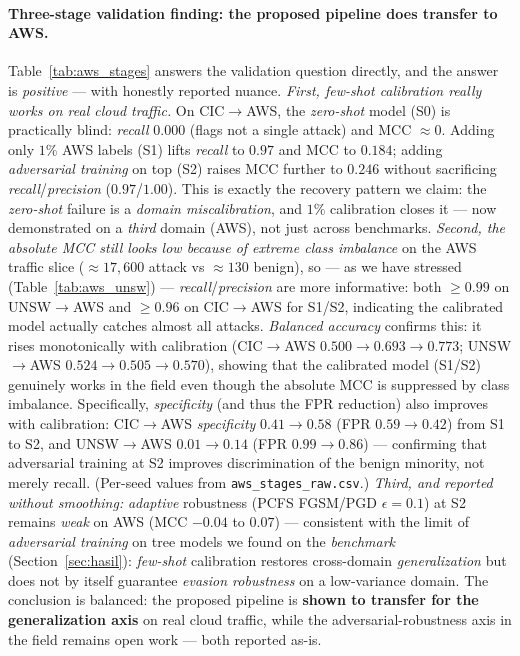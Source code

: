 \documentclass[preprint,12pt,authoryear]{elsarticle}
\begin{document}
\paragraph{Three-stage validation finding: the proposed pipeline does transfer to
AWS.} Table~\ref{tab:aws_stages} answers the validation question directly, and the
answer is \emph{positive} --- with honestly reported nuance. \emph{First, few-shot
calibration really works on real cloud traffic.} On CIC$\rightarrow$AWS, the
\emph{zero-shot} model (S0) is practically blind: \emph{recall} $0.000$ (flags not a
single attack) and MCC $\approx 0$. Adding only $1\%$ AWS labels (S1) lifts
\emph{recall} to $0.97$ and MCC to $0.184$; adding \emph{adversarial training} on
top (S2) raises MCC further to $\mathbf{0.246}$ without sacrificing
\emph{recall}/\emph{precision} ($0.97$/$1.00$). This is exactly the recovery pattern
we claim: the \emph{zero-shot} failure is a \emph{domain miscalibration}, and $1\%$
calibration closes it --- now demonstrated on a \emph{third} domain (AWS), not just
across benchmarks. \emph{Second, the absolute MCC still looks low because of extreme
class imbalance} on the AWS traffic slice ($\approx 17{,}600$ attack vs
$\approx 130$ benign), so --- as we have stressed (Table~\ref{tab:aws_unsw}) ---
\emph{recall}/\emph{precision} are more informative: both $\ge 0.99$ on
UNSW$\rightarrow$AWS and $\ge 0.96$ on CIC$\rightarrow$AWS for S1/S2, indicating the
calibrated model actually catches almost all attacks. \emph{Balanced accuracy} confirms this: it rises monotonically with calibration (CIC$\rightarrow$AWS $0.500 \to 0.693 \to 0.773$; UNSW$\rightarrow$AWS $0.524 \to 0.505 \to 0.570$), showing that the calibrated model (S1/S2) genuinely works in the field even though the absolute MCC is suppressed by class imbalance. Specifically, \emph{specificity} (and thus the FPR reduction) also improves with calibration: CIC$\rightarrow$AWS \emph{specificity} $0.41\to0.58$ (FPR $0.59\to0.42$) from S1 to S2, and UNSW$\rightarrow$AWS $0.01\to0.14$ (FPR $0.99\to0.86$) --- confirming that adversarial training at S2 improves discrimination of the benign minority, not merely recall. (Per-seed values from \texttt{aws\_stages\_raw.csv}.) \emph{Third, and reported
without smoothing:} \emph{adaptive} robustness (PCFS FGSM/PGD $\epsilon{=}0.1$) at S2
remains \emph{weak} on AWS (MCC $-0.04$ to $0.07$) --- consistent with the limit of
\emph{adversarial training} on tree models we found on the \emph{benchmark}
(Section~\ref{sec:hasil}): \emph{few-shot} calibration restores cross-domain
\emph{generalization} but does not by itself guarantee \emph{evasion robustness} on
a low-variance domain. The conclusion is balanced: the proposed pipeline is
\textbf{shown to transfer for the generalization axis} on real cloud traffic, while
the adversarial-robustness axis in the field remains open work --- both reported
as-is.
\end{document}
